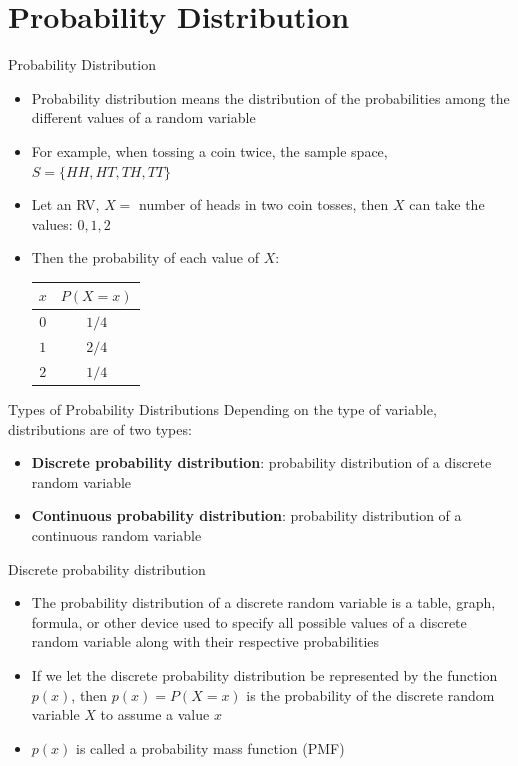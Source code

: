 \documentclass[12pt, aspectratio=169]{beamer}
\begin{document}
	\section{Probability Distribution}

	\begin{frame}{Probability Distribution}
		\begin{itemize}
			\item Probability distribution means the distribution of the probabilities among the different values of a random variable
			\item For example, when tossing a coin twice, the sample space, $S = \{HH, HT, TH, TT\}$
			\item Let an RV, $X = $ number of heads in two coin tosses, then $X$ can take the values: $0, 1, 2$
			\item Then the probability of each value of $X$:
			\begin{center}
				\begin{tabular}{c|c}
					\hline
					$x$ & $P(X = x)$ \\
					\hline
					$0$ & $1/4$ \\
					$1$ & $2/4$ \\
					$2$ & $1/4$ \\
					\hline
				\end{tabular} \label{cointosstable}
			\end{center}
		\end{itemize}
	\end{frame}


	\begin{frame}{Types of Probability Distributions}
		Depending on the type of variable, distributions are of two types:
		\begin{itemize}
			\item \textbf{Discrete probability distribution}: probability distribution of a discrete random variable
			\item \textbf{Continuous probability distribution}: probability distribution of a continuous random variable
		\end{itemize}
	\end{frame}


	\begin{frame}{Discrete probability distribution}
		\begin{itemize}
			\item The probability distribution of a discrete random variable is a table, graph, formula, or other device used to specify all possible values of a discrete random variable along with their respective probabilities
			\item If we let the discrete probability distribution be represented by the function $p(x)$, then $p(x) = P(X = x)$ is the probability of the discrete random variable $X$ to assume a value $x$
			\item $p(x)$ is called a probability mass function (PMF)
		\end{itemize}
	\end{frame}
\end{document}
